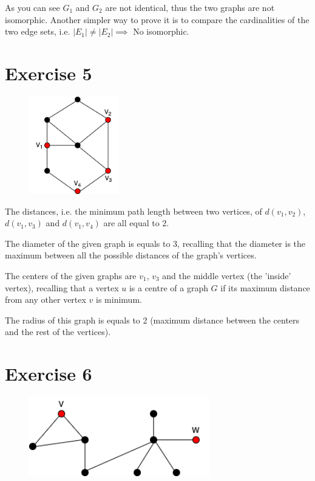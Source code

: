 \documentclass{article}
\begin{document}
    \noindent As you can see \(G_{1}\) and \(G_{2}\) are not identical, thus the two graphs are not isomorphic.\newline
    Another simpler way to prove it is to compare the cardinalities of the two edge sets, i.e. \(|E_{1}| \neq |E_{2}| \implies\) No isomorphic.
    
\section{Exercise 5}
    \begin{figure}[H]
        \centering
        \includegraphics[width=0.35\textwidth]{8.png}
        \label{fig:figure-5}
    \end{figure}
    
    The distances, i.e. the minimum path length between two vertices, of \(d(v_{1},v_{2})\), \(d(v_{1},v_{3})\) and \(d(v_{1},v_{4})\) are all equal to 2.\newline
    
    \par\noindent The diameter of the given graph is equals to 3, recalling that the diameter is the maximum between all the possible distances of the graph's vertices.\newline
    
    \par\noindent The centers of the given graphs are \(v_{1}\), \(v_{3}\) and the middle vertex (the 'inside' vertex), recalling that a vertex \(u\) is a centre of a graph \(G\) if its maximum distance from any other vertex \(v\) is minimum.\newline
    
    \par\noindent The radius of this graph is equals to 2 (maximum distance between the centers and the rest of the vertices).
    
\section{Exercise 6}
    \begin{figure}[H]
        \centering
        \includegraphics[width=0.7\textwidth]{9.png}
        \label{fig:figure-6}
    \end{figure}
    
\end{document}
